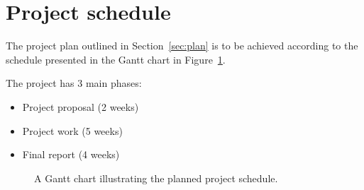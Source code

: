 \documentclass[11pt]{scrartcl}
\begin{document}
{{            %


        }

    }

    \section{Project schedule} {
    \label{sec:schedule}

        The project plan outlined in Section~\ref{sec:plan} is to be achieved
        according to the schedule presented in the Gantt chart in
        Figure~\ref{gantt:proposal}.

        The project has 3 main phases:

        \begin{itemize}
            \item Project proposal (2 weeks)
            \item Project work (5 weeks)
            \item Final report (4 weeks)
        \end{itemize}


        \begin{figure}[H]
            \makebox[\textwidth][c]{\resizebox{0.95\paperwidth}{!}{}}
            \caption[Project Schedule] {
                A Gantt chart illustrating the planned project schedule.
            }
            \label{gantt:proposal}
        \end{figure}
    }
\end{document}
